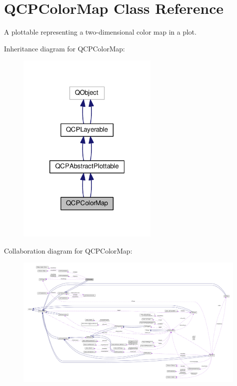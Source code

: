\hypertarget{class_q_c_p_color_map}{}\section{Q\+C\+P\+Color\+Map Class Reference}
\label{class_q_c_p_color_map}


A plottable representing a two-\/dimensional color map in a plot.  




Inheritance diagram for Q\+C\+P\+Color\+Map\+:\nopagebreak
\begin{figure}[H]
\begin{center}
\leavevmode
\includegraphics[width=193pt]{class_q_c_p_color_map__inherit__graph}
\end{center}
\end{figure}


Collaboration diagram for Q\+C\+P\+Color\+Map\+:\nopagebreak
\begin{figure}[H]
\begin{center}
\leavevmode
\includegraphics[width=350pt]{class_q_c_p_color_map__coll__graph}
\end{center}
\end{figure}
